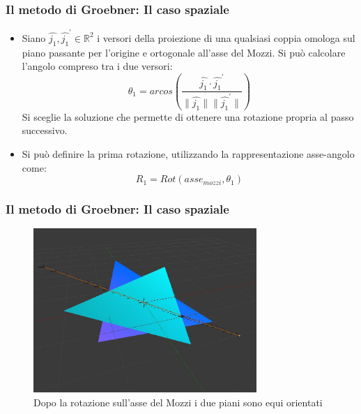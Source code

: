 \documentclass{beamer}
\begin{document}
\begin{frame}
\frametitle{Il metodo di Groebner: Il caso spaziale}
\begin{itemize}
	\item Siano $\hat{j_1}, \hat{j_1}^{'} \in \mathbb{R}^2$ i versori della proiezione di una qualsiasi coppia omologa sul piano passante per l'origine e ortogonale all'asse del Mozzi. Si può calcolare l'angolo compreso tra i due versori:
	\begin{equation}
	\theta_1 = arcos(\frac{\hat{j_1} \cdot \hat{j_1}^{'}}{\| \hat{j_1}\| \|\hat{j_1}^{'}\|})
	\end{equation}
	Si sceglie la soluzione che permette di ottenere una rotazione propria al passo successivo.
	\item Si può definire la prima rotazione, utilizzando la rappresentazione asse-angolo come:
	\begin{equation}
	R_1 = Rot(asse_{mozzi}, \theta_1)
	\end{equation} 
\end{itemize}
\end{frame}

\begin{frame}
\frametitle{Il metodo di Groebner: Il caso spaziale}

\begin{figure}[h]
	\centering
	\includegraphics[width=240pt]{imgs/PianiSuStessoPiano.jpg}
	\caption{Dopo la rotazione sull'asse del Mozzi i due piani sono equi orientati}
	\label{rot:gb:samePlane}
\end{figure} 
\end{frame}
\end{document}
